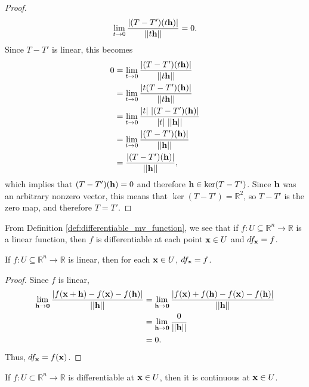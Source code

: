 \documentclass[12pt,letterpaper,reqno]{article}
\numberwithin{equation}{section}
\newcommand{\bh}{{\bf h}}
\newcommand{\R}{\ensuremath{\mathbb R}}
\newcommand{\bx}{{\bf x}}
\begin{document}
{\begin{proof}
\begin{align*}
		\lim_{t \to 0}\frac{|(T-T')(t\bh)|}{||t\bh||}=0.
	\end{align*}
Since $T-T'$ is linear, this becomes
\begin{align*}
		0&=\lim_{t \to 0}\frac{|(T-T')(t\bh)|}{||t\bh||}\\
		&=\lim_{t \to 0}\frac{|t(T-T')(\bh)|}{||t\bh||}\\
		&=\lim_{t \to 0}\frac{|t|\ |(T-T')(\bh)|}{|t| \ ||\bh||}\\
		&= \lim_{t \to 0}\frac{|(T-T')(\bh)|}{||\bh||}\\
		&=\frac{|(T-T')(\bh)|}{||\bh||},
	\end{align*}
		which implies that $(T-T')(\bh)=0$ and therefore $\bh \in \ker (T-T')$. Since $\bh$ was an arbitrary nonzero vector, this means that $\ker(T-T')=\R^2$, so $T-T'$ is the zero map, and therefore $T=T'$.
\end{proof}

From Definition \ref{def:differentiable_mv_function}, we see that if $f:U \subseteq \R^n \to \R$ is a linear function, then $f$ is differentiable at each point $\bx \in U$ and $df_\bx = f$.

\begin{prop}\label{prop:linear_f_equals_diff}
If $f:U \subseteq \R^n \to \R$ is linear, then for each $\bx \in U$, $df_\bx=f$.	
\end{prop}

\begin{proof}
		Since $f$ is linear,
	\begin{align*}
		\lim_{\bh \to {\bf 0}}\frac{|f(\bx+\bh)-f(\bx)-f(\bh)|}{||\bh||}&=\lim_{\bh \to {\bf 0}}\frac{|f(\bx)+f(\bh)-f(\bx)-f(\bh)|}{||\bh||} \\
		&=\lim_{\bh \to {\bf 0}}\frac{0}{||\bh||} \\
		&=0.
	\end{align*}
Thus, $df_\bx=f(\bx)$.
\end{proof}


\begin{thm}
	If $f:U\subset \mathbb{R}^n \to \mathbb{R}$ is differentiable at $\bx \in U$, then it is continuous at $\bx \in U$.
\end{thm}

}
\end{document}
